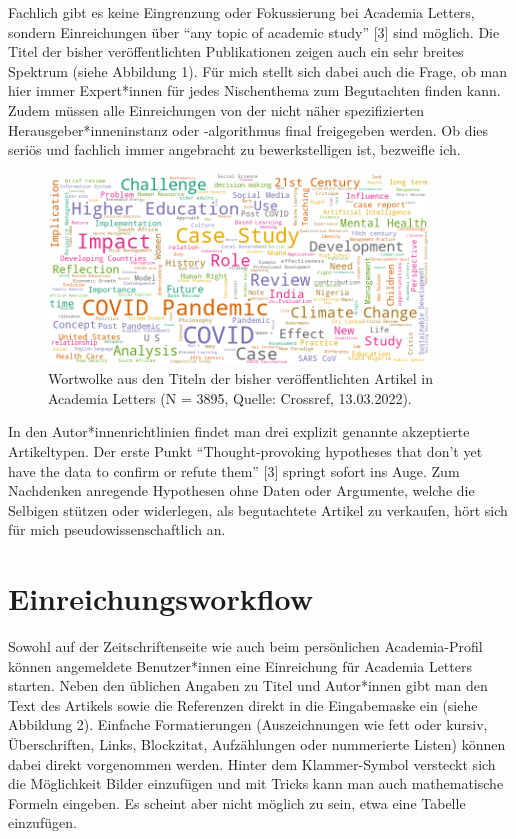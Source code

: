 \documentclass[a4paper,
fontsize=11pt,
oneside,
numbers=noperiodatend,
parskip=half-,
bibliography=totoc,
final
]{scrartcl}
\begin{document}
Fachlich gibt es keine Eingrenzung oder Fokussierung bei Academia
Letters, sondern Einreichungen über \enquote{any topic of academic
study} {[}3{]} sind möglich. Die Titel der bisher veröffentlichten
Publikationen zeigen auch ein sehr breites Spektrum (siehe Abbildung 1).
Für mich stellt sich dabei auch die Frage, ob man hier immer
Expert*innen für jedes Nischenthema zum Begutachten finden kann. Zudem
müssen alle Einreichungen von der nicht näher spezifizierten
Herausgeber*inneninstanz oder -algorithmus final freigegeben werden. Ob
dies seriös und fachlich immer angebracht zu bewerkstelligen ist,
bezweifle ich.

\begin{figure}
\centering
\includegraphics[width=0.9\textwidth]{img/abb1.png}
\caption{Wortwolke aus den Titeln der bisher veröffentlichten Artikel in
Academia Letters (N = 3895, Quelle: Crossref, 13.03.2022).}
\end{figure}

In den Autor*innenrichtlinien findet man drei explizit genannte
akzeptierte Artikeltypen. Der erste Punkt \enquote{Thought-provoking
hypotheses that don't yet have the data to confirm or refute them}
{[}3{]} springt sofort ins Auge. Zum Nachdenken anregende Hypothesen
ohne Daten oder Argumente, welche die Selbigen stützen oder widerlegen,
als begutachtete Artikel zu verkaufen, hört sich für mich
pseudowissenschaftlich an.

\hypertarget{einreichungsworkflow}{%
\section{Einreichungsworkflow}\label{einreichungsworkflow}}

Sowohl auf der Zeitschriftenseite wie auch beim persönlichen
Academia-Profil können angemeldete Benutzer*innen eine Einreichung für
Academia Letters starten. Neben den üblichen Angaben zu Titel und
Autor*innen gibt man den Text des Artikels sowie die Referenzen direkt
in die Eingabemaske ein (siehe Abbildung 2). Einfache Formatierungen
(Auszeichnungen wie fett oder kursiv, Überschriften, Links, Blockzitat,
Aufzählungen oder nummerierte Listen) können dabei direkt vorgenommen
werden. Hinter dem Klammer-Symbol versteckt sich die Möglichkeit Bilder
einzufügen und mit Tricks kann man auch mathematische Formeln eingeben.
Es scheint aber nicht möglich zu sein, etwa eine Tabelle einzufügen.
\end{document}
